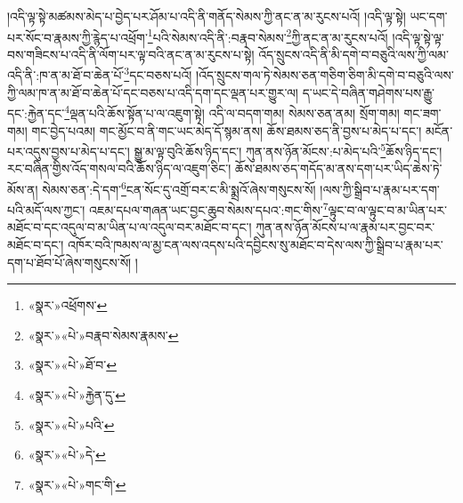 །འདི་ལྟ་སྟེ་མཚམས་མེད་པ་བྱེད་པར་ཤོམ་པ་འདི་ནི་གནོད་སེམས་ཀྱི་ནང་ན་མ་རུངས་པའོ། །འདི་ལྟ་སྟེ། ཡང་དག་པར་སོང་བ་རྣམས་ཀྱི་རྙེད་པ་འཕྲོག་\footnote{«སྣར་»འཕྲོགས་}པའི་སེམས་འདི་ནི་:བརྣབ་སེམས་\footnote{«སྣར་»«པེ་»བརྣབ་སེམས་རྣམས་}ཀྱི་ནང་ན་མ་རུངས་པའོ། །འདི་ལྟ་སྟེ་ལྟ་བས་གཟིངས་པ་འདི་ནི་ལོག་པར་ལྟ་བའི་ནང་ན་མ་རུངས་པ་སྟེ། འོད་སྲུངས་འདི་ནི་མི་དགེ་བ་བཅུའི་ལས་ཀྱི་ལམ་འདི་ནི་:ཁ་ན་མ་ཐོ་བ་ཆེན་པོ་\footnote{«སྣར་»«པེ་»ཐོ་བ་}དང་བཅས་པའོ། །འོད་སྲུངས་གལ་ཏེ་སེམས་ཅན་གཅིག་ཅིག་མི་དགེ་བ་བཅུའི་ལས་ཀྱི་ལམ་ཁ་ན་མ་ཐོ་བ་ཆེན་པོ་དང་བཅས་པ་འདི་དག་དང་ལྡན་པར་གྱུར་ལ། ད་ཡང་དེ་བཞིན་གཤེགས་པས་རྒྱུ་དང་:རྐྱེན་དང་\footnote{«སྣར་»«པེ་»རྐྱེན་དུ་}ལྡན་པའི་ཆོས་སྟོན་པ་ལ་འཇུག་སྟེ། འདི་ལ་བདག་གམ། སེམས་ཅན་ནམ། སྲོག་གམ། གང་ཟག་གམ། གང་བྱེད་པའམ། གང་མྱོང་བ་ནི་གང་ཡང་མེད་དོ་སྙམ་ནས། ཆོས་ཐམས་ཅད་ནི་བྱས་པ་མེད་པ་དང་། མངོན་པར་འདུས་བྱས་པ་མེད་པ་དང་། སྒྱུ་མ་ལྟ་བུའི་ཆོས་ཉིད་དང་། ཀུན་ནས་ཉོན་མོངས་:པ་མེད་པའི་\footnote{«སྣར་»«པེ་»པའི་}ཆོས་ཉིད་དང་། རང་བཞིན་གྱིས་འོད་གསལ་བའི་ཆོས་ཉིད་ལ་འཇུག་ཅིང་། ཆོས་ཐམས་ཅད་གདོད་མ་ནས་དག་པར་ཡིད་ཆེས་ཏེ་མོས་ན། སེམས་ཅན་:དེ་དག་\footnote{«སྣར་»«པེ་»དེ་}ངན་སོང་དུ་འགྲོ་བར་ང་མི་སྨྲའོ་ཞེས་གསུངས་སོ། །ལས་ཀྱི་སྒྲིབ་པ་རྣམ་པར་དག་པའི་མདོ་ལས་ཀྱང་། འཇམ་དཔལ་གཞན་ཡང་བྱང་ཆུབ་སེམས་དཔའ་:གང་གིས་\footnote{«སྣར་»«པེ་»གང་གི་}ལྟུང་བ་ལ་ལྟུང་བ་མ་ཡིན་པར་མཐོང་བ་དང་འདུལ་བ་མ་ཡིན་པ་ལ་འདུལ་བར་མཐོང་བ་དང་། ཀུན་ནས་ཉོན་མོངས་པ་ལ་རྣམ་པར་བྱང་བར་མཐོང་བ་དང་། འཁོར་བའི་ཁམས་ལ་མྱ་ངན་ལས་འདས་པའི་དབྱིངས་སུ་མཐོང་བ་དེས་ལས་ཀྱི་སྒྲིབ་པ་རྣམ་པར་དག་པ་ཐོབ་པོ་ཞེས་གསུངས་སོ། །
